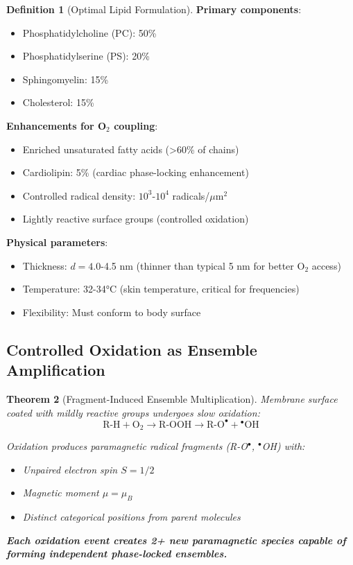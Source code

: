 \documentclass[11pt,a4paper]{article}
\newtheorem{theorem}{Theorem}[section]
\theoremstyle{definition}
\newtheorem{definition}[theorem]{Definition}
\theoremstyle{remark}
\begin{document}
\begin{definition}[Optimal Lipid Formulation]
\textbf{Primary components}:
\begin{itemize}
\item Phosphatidylcholine (PC): 50\%
\item Phosphatidylserine (PS): 20\%
\item Sphingomyelin: 15\%
\item Cholesterol: 15\%
\end{itemize}

\textbf{Enhancements for O$_2$ coupling}:
\begin{itemize}
\item Enriched unsaturated fatty acids (>60\% of chains)
\item Cardiolipin: 5\% (cardiac phase-locking enhancement)
\item Controlled radical density: $10^3$-$10^4$ radicals/$\mu$m$^2$
\item Lightly reactive surface groups (controlled oxidation)
\end{itemize}

\textbf{Physical parameters}:
\begin{itemize}
\item Thickness: $d = 4.0$-4.5 nm (thinner than typical 5 nm for better O$_2$ access)
\item Temperature: 32-34°C (skin temperature, critical for frequencies)
\item Flexibility: Must conform to body surface
\end{itemize}
\end{definition}

\subsection{Controlled Oxidation as Ensemble Amplification}

\begin{theorem}[Fragment-Induced Ensemble Multiplication]
\label{thm:fragment_amplification}
Membrane surface coated with mildly reactive groups undergoes slow oxidation:
\begin{equation}
\text{R-H} + \text{O}_2 \rightarrow \text{R-OOH} \rightarrow \text{R-O}^\bullet + {}^\bullet\text{OH}
\end{equation}

Oxidation produces paramagnetic radical fragments (R-O$^\bullet$, $^\bullet$OH) with:
\begin{itemize}
\item Unpaired electron spin $S = 1/2$
\item Magnetic moment $\mu = \mu_B$
\item Distinct categorical positions from parent molecules
\end{itemize}

\textbf{Each oxidation event creates 2+ new paramagnetic species capable of forming independent phase-locked ensembles.}
\end{theorem}
\end{document}
